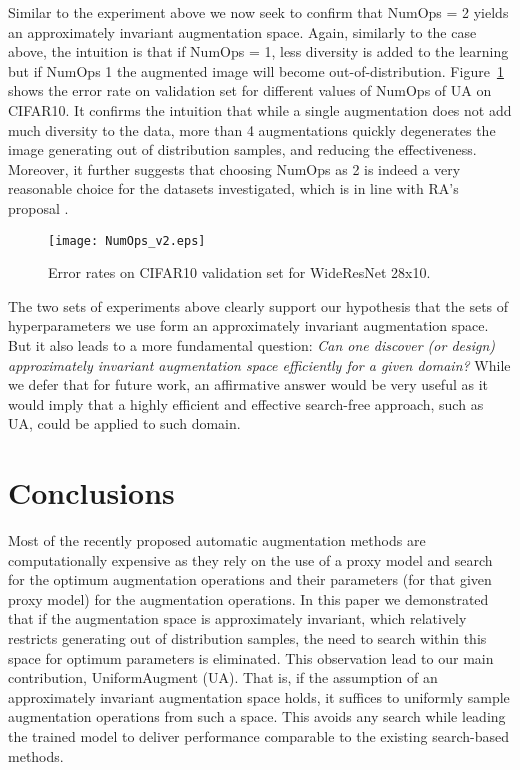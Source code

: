 \documentclass[runningheads]{llncs}
\begin{document}
Similar to the experiment above we now seek to confirm that NumOps = 2 yields an approximately invariant augmentation space.
	Again, similarly to the case above, the intuition is that if NumOps = 1, less diversity is added to the learning but if NumOps  1 the augmented image will become out-of-distribution.
Figure~\ref{fig:numops} shows the error rate on validation set for different values of NumOps of UA on CIFAR10. 
	It confirms the intuition that while a single augmentation does not add much diversity to the data, more than 4 augmentations quickly degenerates the image generating out of distribution samples, and reducing the effectiveness.
Moreover, it further suggests that choosing NumOps as 2 is indeed a very reasonable choice for the datasets investigated, which is in line with RA's proposal \cite{cubuk2019randaugment}.
	
	\begin{figure} [htb]
		\centering
		\texttt{[image: NumOps\_v2.eps]}
		\caption{Error rates on CIFAR10 validation set for WideResNet 28x10.}
		\label{fig:numops}
	\end{figure} 
	




	The two sets of experiments above clearly support our hypothesis that  the sets of hyperparameters we use form an approximately invariant augmentation space.  
	But it also leads to a more fundamental question: \emph{Can one discover (or design) approximately invariant augmentation space efficiently for a given domain?}  While we defer that for future work, an affirmative answer would be very useful as it would imply that a highly efficient and effective search-free approach, such as UA, could be applied to such domain.
	
	
	\section{Conclusions}
	\label{sec:conclusions}
	
	Most of the recently proposed automatic augmentation methods are computationally expensive as they rely on the use of a proxy model and search for the optimum augmentation operations and their parameters (for that given proxy model) for the augmentation operations.
	In this paper we demonstrated that if the augmentation space is approximately invariant, which relatively restricts generating out of distribution samples, the need to search within this space for optimum parameters is eliminated.
	This observation lead to our main contribution, UniformAugment (UA). That is, if the assumption of an approximately invariant augmentation space holds, it suffices to uniformly sample augmentation operations from such a space.  This avoids any search while leading the trained model to deliver performance comparable to the existing search-based methods.  
	
\end{document}
